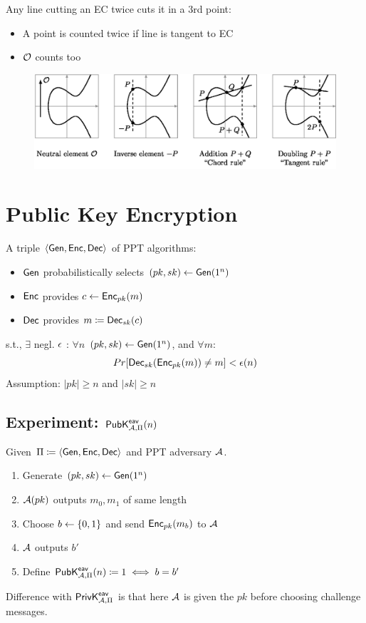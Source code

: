 \documentclass[12pt]{article}
\begin{document}
Any line cutting an  EC twice cuts it in a 3rd point:
\begin{itemize}
\item A point is counted twice if line is tangent to EC
\item $\mathcal{O}$ counts too
\end{itemize}

\begin{figure}[ht]
    \centering
    \includegraphics[width=14cm]{figures/ec_group_operations.png}
\end{figure}
\newpage
\section{Public Key Encryption}
A triple $\langle \operatorname{\mathsf{Gen}}, \operatorname{\mathsf{Enc}}, \operatorname{\mathsf{Dec}} \rangle$ of PPT algorithms:
\begin{itemize}
\item $\operatorname{\mathsf{Gen}}$ probabilistically selects $(pk,sk) \leftarrow \operatorname{\mathsf{Gen}}(1^n)$
\item $\operatorname{\mathsf{Enc}}$ provides $c\leftarrow \operatorname{\mathsf{Enc}}_{pk}(m)$
\item $\operatorname{\mathsf{Dec}}$ provides $m \coloneqq \operatorname{\mathsf{Dec}}_{sk}(c)$
\end{itemize}
s.t., $\exists$ negl. $\epsilon$ : $\forall n$ $(pk,sk) \leftarrow \operatorname{\mathsf{Gen}}(1^n)$, and $\forall m$:
\begin{equation*}
Pr[\operatorname{\mathsf{Dec}}_{sk}(\operatorname{\mathsf{Enc}}_{pk}(m))\neq m] < \epsilon(n)
\end{equation*}
Assumption: $|pk| \ge n$ and $|sk| \ge n$

\subsection{Experiment: $\mathsf{PubK}_{\mathcal{A},\Pi}^\mathsf{eav}(n)$}
Given $\Pi \coloneqq \langle \operatorname{\mathsf{Gen}}, \operatorname{\mathsf{Enc}}, \operatorname{\mathsf{Dec}} \rangle$ and PPT adversary $\mathcal{A}$.
\begin{enumerate}
\item Generate $(pk,sk) \leftarrow \operatorname{\mathsf{Gen}}(1^n)$
\item $\mathcal{A}(pk)$ outputs $m_0, m_1$ of same length
\item Choose $b\leftarrow \{0, 1\}$ and send $\operatorname{\mathsf{Enc}}_{pk}(m_b)$ to $\mathcal{A}$
\item $\mathcal{A}$ outputs $b'$
\item Define $\mathsf{PubK}_{\mathcal{A},\Pi}^\mathsf{eav}(n)\coloneqq 1 \iff b=b'$
\end{enumerate}
Difference with $\mathsf{PrivK}_{\mathcal{A},\Pi}^\mathsf{eav}$ is that here $\mathcal{A}$ is given the $pk$ before choosing challenge messages.
\end{document}
